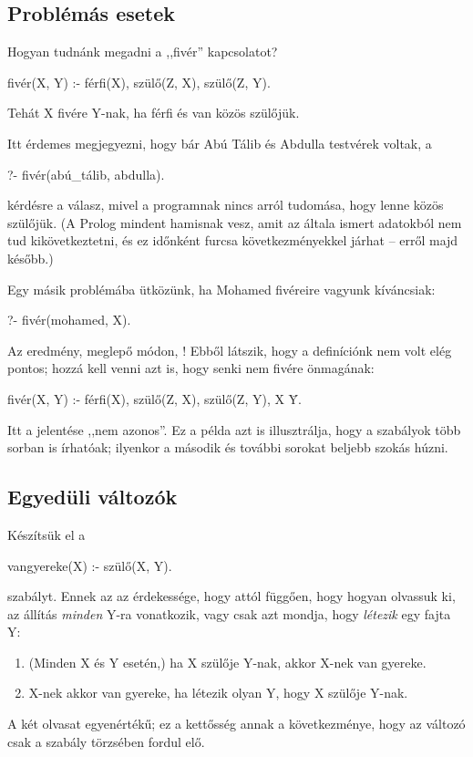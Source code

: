 \subsection*{Problémás esetek}

Hogyan tudnánk megadni a ,,fivér'' kapcsolatot?
\begin{program}
fivér(X, Y) :- férfi(X), szülő(Z, X), szülő(Z, Y).
\end{program}
Tehát X fivére Y-nak, ha férfi és van közös
szülőjük.

Itt érdemes megjegyezni, hogy bár Abú Tálib és
Abdulla testvérek voltak, a
\begin{query}
?- fivér(abú_tálib, abdulla).
\end{query}
kérdésre  a válasz, mivel a programnak
nincs arról tudomása, hogy lenne közös szülőjük. (A
Prolog mindent hamisnak vesz, amit az általa ismert
adatokból nem tud kikövetkeztetni, és ez időnként
furcsa következményekkel járhat -- erről majd
később.)

Egy másik problémába ütközünk, ha Mohamed fivéreire
vagyunk kíváncsiak:
\begin{query}
?- fivér(mohamed, X).
\end{query}
Az eredmény, meglepő módon, ! Ebből
látszik, hogy a definíciónk nem volt elég pontos;
hozzá kell venni azt is, hogy senki nem fivére
önmagának:
\begin{program}
fivér(X, Y) :-
    férfi(X),
    szülő(Z, X), szülő(Z, Y),
    X \= Y.
\end{program}
Itt a \pr{\textbackslash=} jelentése ,,nem azonos''.
\index{\pr{\textbackslash=}} Ez a példa azt is
illusztrálja, hogy a szabályok több sorban is
írhatóak; ilyenkor a második és további sorokat
beljebb szokás húzni.

\subsection*{Egyedüli változók}

Készítsük el a
\begin{program}
vangyereke(X) :- szülő(X, Y).
\end{program}
szabályt.  Ennek az az érdekessége, hogy attól
függően, hogy hogyan olvassuk ki, az állítás
\emph{minden} Y-ra vonatkozik, vagy csak azt
mondja, hogy \emph{létezik} egy fajta Y:

\begin{enumerate}
\item (Minden X és Y esetén,) ha X szülője Y-nak,
  akkor X-nek van gyereke.
\item X-nek akkor van gyereke, ha létezik olyan Y,
  hogy X szülője Y-nak.
\end{enumerate}
A két olvasat egyenértékű; ez a kettősség annak a
következménye, hogy az  változó csak a szabály
törzsében fordul elő.

